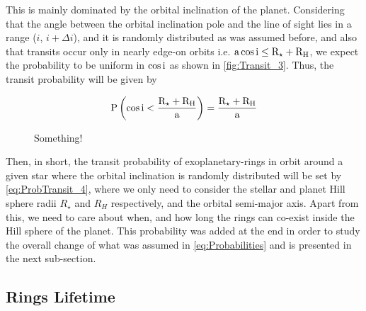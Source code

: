 This is mainly dominated by the orbital inclination of the planet. Considering that the angle between the orbital inclination pole and the line of sight lies in a range ($i$, $i + \Delta i$), and it is randomly distributed as was assumed before, and also that transits occur only in nearly edge-on orbits i.e. $\textnormal{a}\cos \textnormal{i} \leq \textnormal{R}_\star + \textnormal{R}_\textnormal{H}$, we expect the probability to be uniform in $\cos \textnormal{i}$ as shown in \autoref{fig:Transit_3}. Thus, the transit probability will be given by

\begingroup
\Large
\begin{equation}
\textnormal{P} \left( \cos \textnormal{i} < \frac{\textnormal{R}_\star + \textnormal{R}_\textnormal{H}}{\textnormal{a}} \right) = \frac{\textnormal{R}_\star + \textnormal{R}_\textnormal{H}}{\textnormal{a}}
 \label{eq:ProbTransit_4}
\end{equation}
\endgroup

\begin{figure}[!ht]
\centering
\caption{\scriptsize{Something!}}
\label{fig:Transit_3}
\end{figure}

Then, in short, the transit probability of exoplanetary-rings in orbit around a given star where the orbital inclination is randomly distributed will be set by \autoref{eq:ProbTransit_4}, where we only need to consider the stellar and planet Hill sphere radii $R_\star$ and $R_H$ respectively, and the orbital semi-major axis. Apart from this, we need to care about when, and how long the rings can co-exist inside the Hill sphere of the planet. This probability was added at the end in order to study the overall change of what was assumed in \autoref{eq:Probabilities} and is presented in the next sub-section. 

\subsection{Rings Lifetime}\label{subsec:RingsSec}


